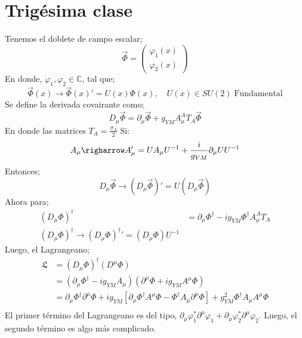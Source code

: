 \documentclass[../main.tex]{subfiles}
\begin{document}
\section{Trigésima clase}
Tenemos el doblete de campo escalar;
\begin{equation}
  \vec{\Phi} = \begin{pmatrix}
    \varphi_1(x) \\ \varphi_2(x)
  \end{pmatrix}
 \end{equation}
 En donde, $\varphi_1, \varphi_2\in \mathbb{C}$, tal que;
 \begin{equation}
   \vec{\Phi}(x) \rightarrow \vec{\Phi}(x)' = U(x)\Phi(x), \quad U(x)\in SU(2)\; \text{Fundamental}
  \end{equation}
  Se define la derivada covairante como;
  \begin{equation}
    D_\mu \vec{\Phi} = \partial_\mu \vec{\Phi} + g_{YM} A^A_\mu T_A \vec{\Phi}
   \end{equation}
  En donde las matrices $T_A=\frac{\sigma_A}{2}$
Si:
\begin{equation}
  A_\mu \righarrow A_\mu' = UA_\mu U^{-1} + \frac{i}{g_{YM}} \partial_\mu U U^{-1}
 \end{equation}
 Entonces;
 \begin{equation}
   D_\mu \vec{\Phi} \rightarrow \left( D_\mu \vec{\Phi} \right)' = U \left( D_\mu \vec{\Phi} \right)
  \end{equation}
  Ahora para;
  \begin{align*}
    \left( D_\mu \Phi \right)^\dagger & = \partial_\mu \Phi^\dagger - ig_{YM} \Phi^\dagger A^A_\mu T_A \\
    \left( D_\mu \Phi \right)^\dagger \rightarrow \left( D_\mu \Phi \right)^\dagger' = \left( D_\mu \Phi \right)U^{-1}
  \end{align*}
Luego, el Lagrangeano;
\begin{align*}
  \mathfrak{L} & = \left( D_\mu \Phi \right)^\dagger \left( D^\mu \Phi \right) \\
  & = \left( \partial_\mu \Phi^\dagger - ig_{YM} A_\mu \right) \left( \partial^\mu \Phi + ig_{YM} A^\mu \Phi \right) \\
  & = \partial_\mu \Phi^\dagger \partial^\mu \Phi + ig_{YM} \left[ \partial_\mu \Phi^\dagger A^\mu \Phi - \Phi^\dagger A_\mu \partial^\mu \Phi \right] + g^2_{YM} \Phi^\dagger A_\mu A^\mu \Phi \\
\end{align*}
El primer término del Lagrangeano es del tipo, $\partial_\mu \varphi_1^* \partial^\mu \varphi_1 + \partial_\mu \varphi^*_2 \partial^\mu \varphi_2$. Luego, el segundo término es algo más complicado. 
\end{document}
